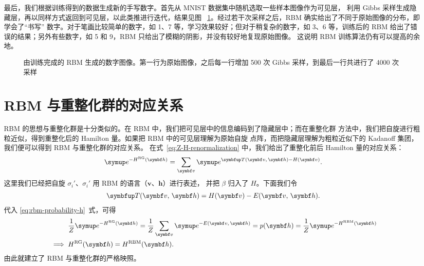 最后，我们根据训练得到的数据生成新的手写数字。首先从 MNIST 数据集中随机选取一些样本图像作为可见层，
利用 Gibbs 采样生成隐藏层，再以同样方式返回到可见层，以此类推进行迭代，结果见图~%
\ref{fig:mnist-samples}。经过若干次采样之后，RBM 确实给出了不同于原始图像的分布，即学会了“书写”
数字。对于笔画比较简单的数字，如 1、7 等，学习效果较好；但对于稍复杂的数字，如 3、6 等，训练后的
RBM 给出了错误的结果；另外有些数字，如 5 和 9，RBM 只给出了模糊的阴影，并没有较好地复现原始图像。
这说明 RBM 训练算法仍有可以提高的余地。

\begin{figure}[htb]
  \centering
  \caption{由训练完成的 RBM 生成的数字图像。第一行为原始图像，之后每一行增加 \num{500} 次 Gibbs
    采样，到最后一行共进行了 \num{4000} 次采样}
  \label{fig:mnist-samples}
\end{figure}

\section{RBM 与重整化群的对应关系}

RBM 的思想与重整化群是十分类似的。在 RBM 中，我们把可见层中的信息编码到了隐藏层中；而在重整化群
方法中，我们把自旋进行粗粒近似，得到重整化后的 Hamilton 量。如果把 RBM 中的可见层理解为原始自旋
点阵，而把隐藏层理解为粗粒近似下的 Kadanoff 集团，我们便可以得到 RBM 与重整化群的对应关系。
在式~\eqref{eq:Z-H-renormalization} 中，我们给出了重整化前后 Hamilton 量的对应关系：
\begin{equation}
    \ee^{-H^{\text{RG}}(\bm{h})}
  = \sum_{\bm{v}} \ee^{\opT(\bm{v},\,\bm{h})-H(\bm{v})}.
\end{equation}
这里我们已经把自旋 $\sigma_i'$、$\sigma_i'$ 用 RBM 的语言（$\bm{v}$、$\bm{h}$）进行表述，
并把 $\beta$ 归入了 $H$。下面我们令
\begin{equation}
  \opT(\bm{v},\,\bm{h}) = H(\bm{v}) - E(\bm{v},\,\bm{h}).
\end{equation}
代入 \eqref{eq:rbm-probability-h}~式，可得
\begin{align}
  &\mathrel{\phantom{\implies}}
    \frac{1}{Z} \ee^{-H^{\text{RG}}(\bm{h})}
  = \frac{1}{Z} \sum_{\bm{v}} \ee^{-E(\bm{v},\,\bm{h})}
  = p(\bm{h})
  = \frac{1}{Z} \ee^{-H^{\text{RBM}}(\bm{h})} \notag \\
  &\implies H^{\text{RG}}(\bm{h}) = H^{\text{RBM}}(\bm{h}).
\end{align}
由此就建立了 RBM 与重整化群的严格映照。

